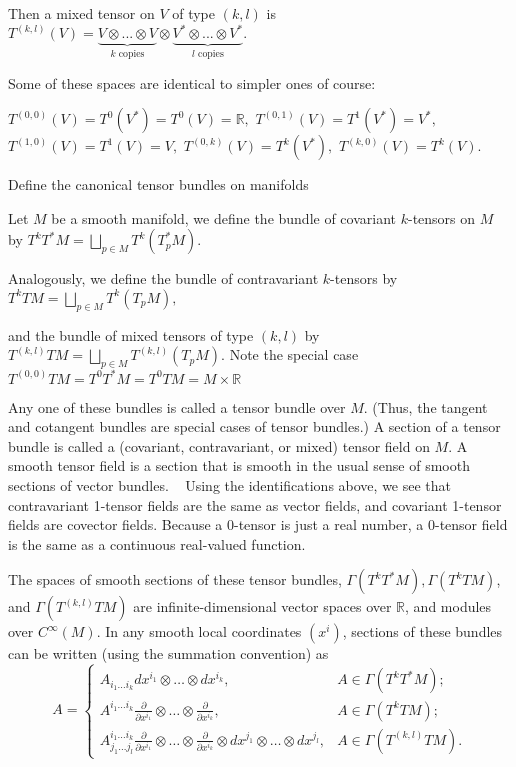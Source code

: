 Then a mixed tensor on \( V \) of type \( (k,l) \) is
\( T^{(k,l)}(V) = \underbrace{V \otimes ... \otimes V}_{k \text{ copies}} \otimes \underbrace{V^* \otimes ... \otimes V^*}_{l \text{ copies}}. \)

Some of these spaces are identical to simpler ones of course:

\( T^{(0,0)}(V) = T^0(V^*) = T^0(V) = \mathbb{R}, \)
\( T^{(0,1)}(V) = T^1(V^*) = V^*, \)
\( T^{(1,0)}(V) = T^1(V) = V, \)
\( T^{(0,k)}(V) = T^k(V^*), \)
\( T^{(k,0)}(V) = T^k(V). \)

Define the canonical tensor bundles on manifolds

Let \(M\) be a smooth manifold, we define the bundle of covariant \(k\)-tensors on \(M\) by
\(T^{k}T^\ast M = \bigsqcup_{p \in M} T^k (T_p^*M).\)

Analogously, we define the bundle of contravariant \(k\)-tensors by
\(T^{k}TM = \bigsqcup_{p \in M} T^k (T_pM),\)

and the bundle of mixed tensors of type \((k,l)\) by
\(T^{(k,l)}TM = \bigsqcup_{p \in M} T^{(k,l)} (T_pM).\)
Note the special case
\( T^{(0,0)} TM = T^{0}T^\ast M = T^{0}TM = M \times \mathbb{R} \)

Any one of these bundles is called a tensor bundle over \(M\). 
(Thus, the tangent and cotangent bundles are special cases of tensor bundles.) 
A section of a tensor bundle is called a (covariant, contravariant, or mixed) tensor field on \(M\). 
A smooth tensor field is a section that is smooth in the usual sense of smooth sections of vector bundles.   
Using the identifications above, we see that contravariant 1-tensor fields are the same as vector fields, and covariant 1-tensor fields are covector fields. 
Because a 0-tensor is just a real number, a 0-tensor field is the same as a continuous real-valued function. 

The spaces of smooth sections of these tensor bundles, \(\Gamma(T^{k}T^{*}M), \Gamma(T^{k}TM)\), 
and \(\Gamma(T^{(k,l)}TM)\) are infinite-dimensional vector spaces over \(\mathbb{R}\), and modules over \(C^{\infty}(M)\). 
In any smooth local coordinates \((x^{i})\), sections of these bundles can be written (using the summation convention) as
\[
A =
\begin{cases}
A_{i_1 \dots i_k} dx^{i_1} \otimes \dots \otimes dx^{i_k}, & A \in \Gamma(T^{k}T^*M); \\
A^{i_1 \dots i_k} \frac{\partial}{\partial x^{i_1}} \otimes \dots \otimes \frac{\partial}{\partial x^{i_k}}, & A \in \Gamma(T^{k}TM); \\
A^{i_1 \dots i_k}_{j_1 \dots j_l} \frac{\partial}{\partial x^{i_1}} \otimes \dots \otimes \frac{\partial}{\partial x^{i_k}} \otimes dx^{j_1} \otimes \dots \otimes dx^{j_l}, & A \in \Gamma(T^{(k,l)} TM).
\end{cases}
\]

